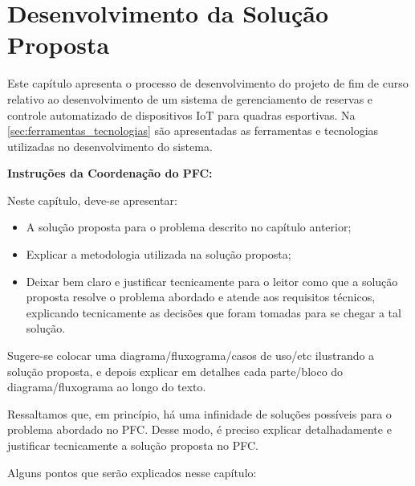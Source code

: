 \chapter{Desenvolvimento da Solução Proposta}

Este capítulo apresenta o processo de desenvolvimento do projeto de fim de curso relativo ao desenvolvimento de um sistema de gerenciamento de reservas e controle automatizado de dispositivos IoT para quadras esportivas. Na \autoref{sec:ferramentas_tecnologias} são apresentadas as ferramentas e tecnologias utilizadas no desenvolvimento do sistema. 


\textbf{Instruções da Coordenação do PFC:}

Neste capítulo, deve-se apresentar:
\begin{itemize}
	\item A solução proposta para o problema descrito no capítulo anterior;
	\item Explicar a metodologia utilizada na solução proposta;
	\item Deixar bem claro e justificar tecnicamente para o leitor como que a solução proposta resolve o problema abordado e atende aos requisitos técnicos, explicando tecnicamente as decisões que foram tomadas para se chegar a tal solução.
\end{itemize}

Sugere-se colocar uma diagrama/fluxograma/casos de uso/etc ilustrando a solução proposta, e depois explicar em detalhes cada parte/bloco do diagrama/fluxograma ao longo do texto. 

Ressaltamos que, em princípio, há uma infinidade de soluções possíveis para o problema abordado no PFC. Desse modo, é preciso explicar detalhadamente e justificar tecnicamente a solução proposta no PFC.

Alguns pontos que serão explicados nesse capítulo:

